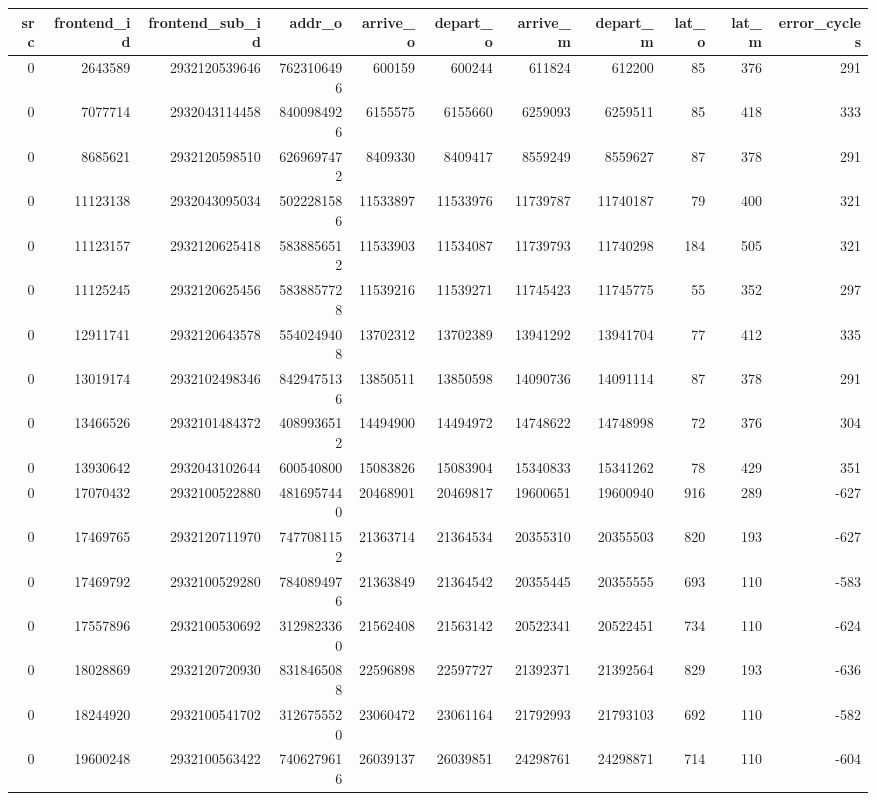 \begin{tabular}{rrrrrrrrrrr}
\toprule
src & frontend\_id & frontend\_sub\_id & addr\_o & arrive\_o & depart\_o & arrive\_m & depart\_m & lat\_o & lat\_m & error\_cycles \\
\midrule
0 & 2643589 & 2932120539646 & 7623106496 & 600159 & 600244 & 611824 & 612200 & 85 & 376 & 291 \\
0 & 7077714 & 2932043114458 & 8400984926 & 6155575 & 6155660 & 6259093 & 6259511 & 85 & 418 & 333 \\
0 & 8685621 & 2932120598510 & 6269697472 & 8409330 & 8409417 & 8559249 & 8559627 & 87 & 378 & 291 \\
0 & 11123138 & 2932043095034 & 5022281586 & 11533897 & 11533976 & 11739787 & 11740187 & 79 & 400 & 321 \\
0 & 11123157 & 2932120625418 & 5838856512 & 11533903 & 11534087 & 11739793 & 11740298 & 184 & 505 & 321 \\
0 & 11125245 & 2932120625456 & 5838857728 & 11539216 & 11539271 & 11745423 & 11745775 & 55 & 352 & 297 \\
0 & 12911741 & 2932120643578 & 5540249408 & 13702312 & 13702389 & 13941292 & 13941704 & 77 & 412 & 335 \\
0 & 13019174 & 2932102498346 & 8429475136 & 13850511 & 13850598 & 14090736 & 14091114 & 87 & 378 & 291 \\
0 & 13466526 & 2932101484372 & 4089936512 & 14494900 & 14494972 & 14748622 & 14748998 & 72 & 376 & 304 \\
0 & 13930642 & 2932043102644 & 600540800 & 15083826 & 15083904 & 15340833 & 15341262 & 78 & 429 & 351 \\
0 & 17070432 & 2932100522880 & 4816957440 & 20468901 & 20469817 & 19600651 & 19600940 & 916 & 289 & -627 \\
0 & 17469765 & 2932120711970 & 7477081152 & 21363714 & 21364534 & 20355310 & 20355503 & 820 & 193 & -627 \\
0 & 17469792 & 2932100529280 & 7840894976 & 21363849 & 21364542 & 20355445 & 20355555 & 693 & 110 & -583 \\
0 & 17557896 & 2932100530692 & 3129823360 & 21562408 & 21563142 & 20522341 & 20522451 & 734 & 110 & -624 \\
0 & 18028869 & 2932120720930 & 8318465088 & 22596898 & 22597727 & 21392371 & 21392564 & 829 & 193 & -636 \\
0 & 18244920 & 2932100541702 & 3126755520 & 23060472 & 23061164 & 21792993 & 21793103 & 692 & 110 & -582 \\
0 & 19600248 & 2932100563422 & 7406279616 & 26039137 & 26039851 & 24298761 & 24298871 & 714 & 110 & -604 \\

\end{tabular}
